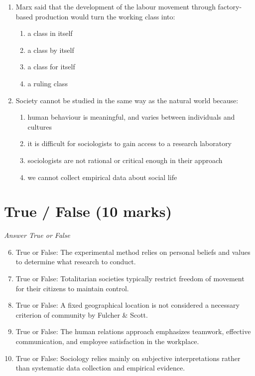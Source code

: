 \documentclass[12pt]{article}
\begin{document}
\begin{enumerate}[label=\arabic*.]
\item Marx said that the development of the labour movement through factory-based production would turn the working class into:
\begin{enumerate}[label=(\alph*)]
    \item a class in itself
    \item a class by itself
    \item a class for itself
    \item a ruling class
\end{enumerate}
\item Society cannot be studied in the same way as the natural world because:
\begin{enumerate}[label=(\alph*)]
    \item human behaviour is meaningful, and varies between individuals and cultures
    \item it is difficult for sociologists to gain access to a research laboratory
    \item sociologists are not rational or critical enough in their approach
    \item we cannot collect empirical data about social life
\end{enumerate}
\end{enumerate}

\section*{True / False (10 marks)}
\textit{Answer True or False}
\begin{enumerate}[label=\arabic*.]
\setcounter{enumi}{5}
\item True or False: The experimental method relies on personal beliefs and values to determine what research to conduct.
\item True or False: Totalitarian societies typically restrict freedom of movement for their citizens to maintain control.
\item True or False: A fixed geographical location is not considered a necessary criterion of community by Fulcher \& Scott.
\item True or False: The human relations approach emphasizes teamwork, effective communication, and employee satisfaction in the workplace.
\item True or False: Sociology relies mainly on subjective interpretations rather than systematic data collection and empirical evidence.
\end{enumerate}
\end{document}
